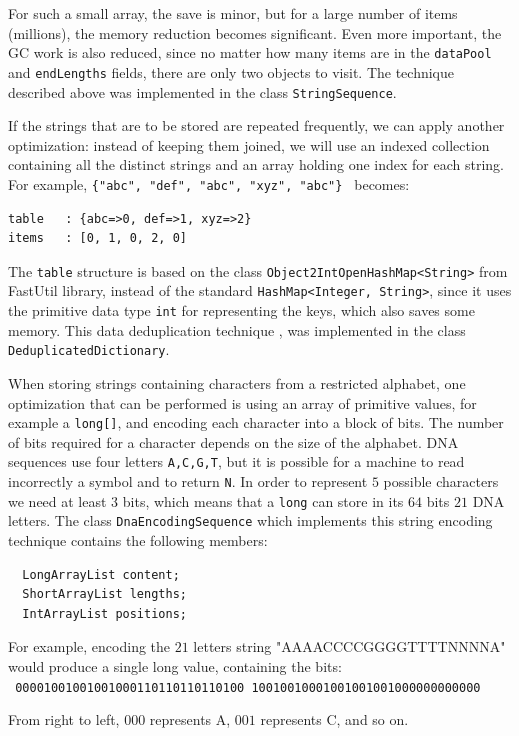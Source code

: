 \documentclass[a4paper,twoside]{article}
\begin{document}
For such a small array, the save is minor, but for a large number of items (millions), the memory reduction becomes significant. Even more important, the GC work is also reduced, since no matter how many items are in the {\tt dataPool} and {\tt endLengths} fields, there are only two objects to visit.
The technique described above was implemented in the class {\tt StringSequence}.

If the strings that are to be stored are repeated frequently, we can apply another optimization:
instead of keeping them joined, we will use an indexed collection containing all the distinct strings and an array holding one index for each string.
For example, {\tt \{"abc", "def", "abc", "xyz", "abc"\} } becomes: 
\begin{verbatim}
table   : {abc=>0, def=>1, xyz=>2}
items   : [0, 1, 0, 2, 0]
\end{verbatim}
The {\tt table} structure is based on the class {\tt Object2IntOpenHashMap<String>} from FastUtil library, instead of the standard {\tt HashMap<Integer, String>}, since it uses the primitive data type {\tt int} for representing the keys, which also saves some memory.
This data deduplication technique \cite{he:2010}, \cite{manogar:2014} was implemented in the class {\tt DeduplicatedDictionary}.

When storing strings containing characters from a restricted alphabet, one optimization that can be performed is using an array of primitive values, for example a {\tt long[]}, and encoding each character into a block of bits. The number of bits required for a character depends on the size of the alphabet.
DNA sequences use four letters {\tt A,C,G,T}, but it is possible for a machine to read incorrectly a symbol and to return {\tt N}. In order to represent $5$ possible characters we need at least $3$ bits,
which means that a {\tt long} can store in its $64$ bits $21$ DNA letters. 
The class {\tt DnaEncodingSequence} which implements this string encoding technique contains the following members:
\begin{verbatim}
  LongArrayList content;
  ShortArrayList lengths;      
  IntArrayList positions;     
\end{verbatim}
For example, encoding the $21$ letters string "AAAACCCCGGGGTTTTNNNNA" would produce a single long value, containing the bits:\\
{\tt
00001001001001000110110110110100
10010010001001001001000000000000
}

From right to left, $000$ represents A, $001$ represents C, and so on.
\end{document}
